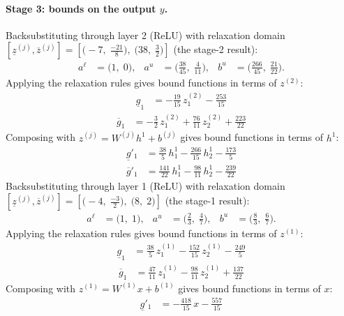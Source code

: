 \documentclass[11pt]{article}
\begin{document}
\paragraph{Stage 3: bounds on the output $y$.}
Backsubstituting through layer 2 (ReLU) with relaxation domain $[\underline{z}^{(j)}, \overline{z}^{(j)}] = [\bigl(-7,\; \frac{-21}{8}\bigr),\; \bigl(38,\; \frac{3}{2}\bigr)]$ (the stage-2 result):
\begin{align*}
a^{\ell} &= \bigl(1,\; 0\bigr), & a^{u} &= \bigl(\frac{38}{45},\; \frac{4}{11}\bigr), & b^{u} &= \bigl(\frac{266}{45},\; \frac{21}{22}\bigr).
\end{align*}
Applying the relaxation rules gives bound functions in terms of $z^{(2)}$:
\begin{align*}
\underline{g}_{1} &= -\frac{19}{15}\,z^{(2)}_{1} - \frac{253}{15}
\end{align*}
\begin{align*}
\overline{g}_{1} &= -\frac{3}{2}\,z^{(2)}_{1} + \frac{76}{11}\,z^{(2)}_{2} + \frac{223}{22}
\end{align*}
Composing with $z^{(j)} = W^{(j)} h^{1} + b^{(j)}$ gives bound functions in terms of $h^{1}$:
\begin{align*}
\underline{g}'_{1} &= \frac{38}{5}\,h^{1}_{1} - \frac{266}{15}\,h^{1}_{2} - \frac{173}{5}
\end{align*}
\begin{align*}
\overline{g}'_{1} &= \frac{141}{22}\,h^{1}_{1} - \frac{98}{11}\,h^{1}_{2} - \frac{239}{22}
\end{align*}
Backsubstituting through layer 1 (ReLU) with relaxation domain $[\underline{z}^{(j)}, \overline{z}^{(j)}] = [\bigl(-4,\; \frac{-3}{2}\bigr),\; \bigl(8,\; 2\bigr)]$ (the stage-1 result):
\begin{align*}
a^{\ell} &= \bigl(1,\; 1\bigr), & a^{u} &= \bigl(\frac{2}{3},\; \frac{4}{7}\bigr), & b^{u} &= \bigl(\frac{8}{3},\; \frac{6}{7}\bigr).
\end{align*}
Applying the relaxation rules gives bound functions in terms of $z^{(1)}$:
\begin{align*}
\underline{g}_{1} &= \frac{38}{5}\,z^{(1)}_{1} - \frac{152}{15}\,z^{(1)}_{2} - \frac{249}{5}
\end{align*}
\begin{align*}
\overline{g}_{1} &= \frac{47}{11}\,z^{(1)}_{1} - \frac{98}{11}\,z^{(1)}_{2} + \frac{137}{22}
\end{align*}
Composing with $z^{(1)} = W^{(1)} x + b^{(1)}$ gives bound functions in terms of $x$:
\begin{align*}
\underline{g}'_{1} &= -\frac{418}{15}\,x - \frac{557}{15}
\end{align*}
\end{document}
